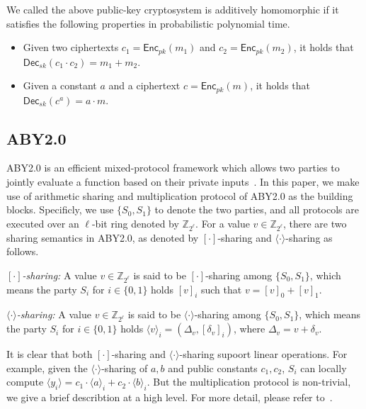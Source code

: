 \documentclass[conference]{IEEEtran}
\begin{document}
We called the above public-key cryptosystem is additively homomorphic if it satisfies the following properties in probabilistic polynomial time.

\begin{itemize}
  \item Given two ciphertexts $c_1 = \mathsf{Enc}_{pk}(m_1)$ and $c_2 = \mathsf{Enc}_{pk}(m_2)$, it holds that $\mathsf{Dec}_{sk}(c_1 \cdot c_2) = m_1 + m_2$.
  \item Given a constant $a$ and a ciphertext $c=\mathsf{Enc}_{pk}(m)$, it holds that $\mathsf{Dec}_{sk}(c^a) = a\cdot m$.
\end{itemize}

\iffalse
\subsection{ABY2.0}

ABY2.0 is an efficient mixed-protocol framework which allows two parties to jointly evaluate a function based on their private inputs~\cite{patra_aby20_2020}.
In this paper, we make use of arithmetic sharing and multiplication protocol of ABY2.0 as the building blocks.
Specificly, we use $\{S_0, S_1\}$ to denote the two parties, and all protocols are executed over an $\ell$-bit ring denoted by $\mathbb{Z}_{2^\ell}$.
For a value $v\in\mathbb{Z}_{2^\ell}$, there are two sharing semantics in ABY2.0, as denoted by $[\cdot]$-sharing and $\langle \cdot \rangle$-sharing as follows.

\textit{$[\cdot]$-sharing:} A value $v\in\mathbb{Z}_{2^\ell}$ is said to be $[\cdot]$-sharing among $\{S_0, S_1\}$, which means the party $S_i$ for $i\in\{0,1\}$ holds $[v]_i$ such that $v = [v]_0 + [v]_1$.

\textit{$\langle \cdot \rangle$-sharing:} A value $v\in\mathbb{Z}_{2^\ell}$ is said to be $\langle \cdot \rangle$-sharing among $\{S_0, S_1\}$, which means the party $S_i$ for $i\in\{0,1\}$ holds $\langle v \rangle_i = (\Delta_v, [\delta_v]_i)$, where $\Delta_v = v + \delta_v$.

It is clear that both $[\cdot]$-sharing and $\langle \cdot \rangle$-sharing supoort linear operations.
For example, given the $\langle \cdot \rangle$-sharing of $a,b$ and public constants $c_1,c_2$, $S_i$ can locally compute $\langle y_i \rangle = c_1 \cdot \langle a \rangle_i + c_2 \cdot \langle b \rangle_i$.
But the multiplication protocol is non-trivial, we give a brief describtion at a high level.
For more detail, please refer to~\cite{patra_aby20_2020}.
\end{document}

